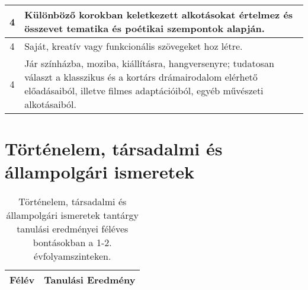 \begin{longtable}{c | p{12cm} }
                                          4 &  Különböző korokban keletkezett alkotásokat értelmez és összevet tematika és poétikai szempontok alapján. \\ \hline
                                          4 &  Saját, kreatív vagy funkcionális szövegeket hoz létre. \\ \hline
                                          4 &  Jár színházba, moziba, kiállításra, hangversenyre; tudatosan választ a klasszikus és a kortárs drámairodalom elérhető előadásaiból, illetve filmes adaptációiból, egyéb művészeti alkotásaiból. \\ \hline
                                      
                        \end{longtable}
            \clearpage

        \section{Történelem, társadalmi és állampolgári ismeretek}

       
           \begin{longtable}{c | p{12cm} }
            \caption[Történelem, társadalmi és állampolgári ismeretek 1-2.]{Történelem, társadalmi és állampolgári ismeretek tantárgy tanulási eredményei féléves bontásokban a 1-2. évfolyamszinteken. }  \\

            \textbf{Félév} & \textbf{Tanulási Eredmény} \\
            \hline
            \endhead
                                
                                      
                                
                                      
                                
                                      
                                
                                      
                                
                                      
                        \end{longtable}
            \clearpage

